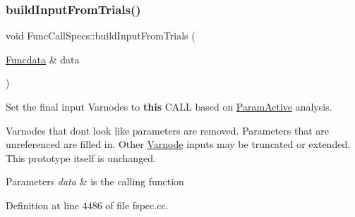 \subsubsection{\texorpdfstring{buildInputFromTrials()}{buildInputFromTrials()}}
{\footnotesize\ttfamily void Func\+Call\+Specs\+::build\+Input\+From\+Trials (\begin{DoxyParamCaption}\item[{\mbox{\hyperlink{class_funcdata}{Funcdata}} \&}]{data }\end{DoxyParamCaption})}



Set the final input Varnodes to {\bfseries{this}} C\+A\+LL based on \mbox{\hyperlink{class_param_active}{Param\+Active}} analysis. 

Varnodes that don\textquotesingle{}t look like parameters are removed. Parameters that are unreferenced are filled in. Other \mbox{\hyperlink{class_varnode}{Varnode}} inputs may be truncated or extended. This prototype itself is unchanged. 
\begin{DoxyParams}{Parameters}
{\em data} & is the calling function \\
\hline
\end{DoxyParams}


Definition at line 4486 of file fspec.\+cc.

